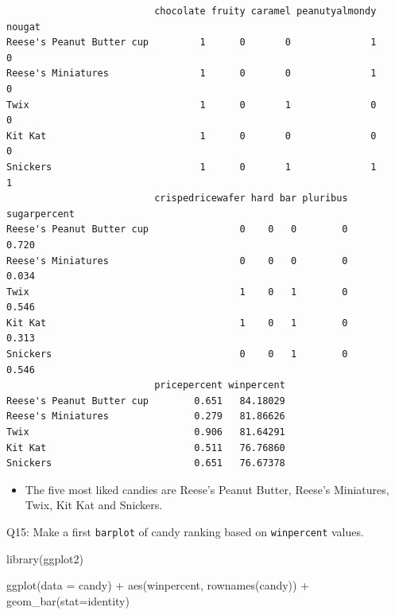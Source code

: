 \documentclass[
  letterpaper,
  DIV=11,
  numbers=noendperiod]{scrartcl}
\newenvironment{Shaded}{\begin{snugshade}}{\end{snugshade}}
\newcommand{\AttributeTok}[1]{\textcolor[rgb]{0.40,0.45,0.13}{#1}}
\newcommand{\FunctionTok}[1]{\textcolor[rgb]{0.28,0.35,0.67}{#1}}
\newcommand{\NormalTok}[1]{\textcolor[rgb]{0.00,0.23,0.31}{#1}}
\newcommand{\SpecialCharTok}[1]{\textcolor[rgb]{0.37,0.37,0.37}{#1}}
\newcommand{\StringTok}[1]{\textcolor[rgb]{0.13,0.47,0.30}{#1}}
\providecommand{\tightlist}{%
  \setlength{\itemsep}{0pt}\setlength{\parskip}{0pt}}\usepackage{longtable,booktabs,array}
\begin{document}
\begin{verbatim}
                          chocolate fruity caramel peanutyalmondy nougat
Reese's Peanut Butter cup         1      0       0              1      0
Reese's Miniatures                1      0       0              1      0
Twix                              1      0       1              0      0
Kit Kat                           1      0       0              0      0
Snickers                          1      0       1              1      1
                          crispedricewafer hard bar pluribus sugarpercent
Reese's Peanut Butter cup                0    0   0        0        0.720
Reese's Miniatures                       0    0   0        0        0.034
Twix                                     1    0   1        0        0.546
Kit Kat                                  1    0   1        0        0.313
Snickers                                 0    0   1        0        0.546
                          pricepercent winpercent
Reese's Peanut Butter cup        0.651   84.18029
Reese's Miniatures               0.279   81.86626
Twix                             0.906   81.64291
Kit Kat                          0.511   76.76860
Snickers                         0.651   76.67378
\end{verbatim}

\begin{itemize}
\tightlist
\item
  The five most liked candies are Reese's Peanut Butter, Reese's
  Miniatures, Twix, Kit Kat and Snickers.
\end{itemize}

Q15: Make a first \texttt{barplot} of candy ranking based on
\texttt{winpercent} values.

\begin{Shaded}
\begin{Highlighting}[]
\FunctionTok{library}\NormalTok{(ggplot2)}

\FunctionTok{ggplot}\NormalTok{(}\AttributeTok{data =}\NormalTok{ candy) }\SpecialCharTok{+}
  \FunctionTok{aes}\NormalTok{(winpercent, }\FunctionTok{rownames}\NormalTok{(candy)) }\SpecialCharTok{+} 
  \FunctionTok{geom\_bar}\NormalTok{(}\AttributeTok{stat=}\StringTok{\textquotesingle{}identity\textquotesingle{}}\NormalTok{)}
\end{Highlighting}
\end{Shaded}
\end{document}
